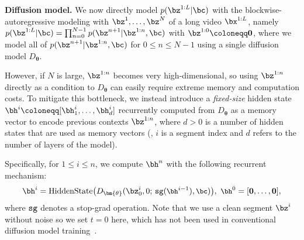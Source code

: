\textbf{Diffusion model.}
We now directly model $p(\bz^{1:L}|\bc)$ with the blockwise-autoregressive modeling with $\bz^{1}, \ldots, \bz^{N}$ of a long video $\bx^{1:L}$, namely $p (\bz^{1:L} | \bc) = \prod_{n=0}^{N-1} p(\bz^{n+1} | \bz^{1:n}, \bc)$ with $\bz^{1:0}\coloneqq \mathbf{0}$,
where we model all of $p(\bz^{n+1} | \bz^{1:n}, \bc)$ for $0\leq n \leq N-1$ using a single diffusion model $D_{\bm{\theta}}$.

However, if $N$ is large, $\bz^{1:n}$ becomes very high-dimensional, so using $\bz^{1:n}$ directly as a condition to $D_{\bm{\theta}}$ can easily require extreme memory and computation costs. To mitigate this bottleneck, we instead introduce a \emph {fixed-size} hidden state $\bh^{i} \coloneqq [\bh^{i}_1, \ldots, \bh^{i}_{d}]$ recurrently computed from $D_{\bm{\theta}}$ as a memory vector to encode previous contexts $\bz^{1:n}$, where $d>0$ is a number of hidden states that are used as memory vectors (\ie, $i$ is a segment index and $d$ refers to the number of layers of the model). 

Specifically, for $1 \leq i \leq n$, we compute $\bh^n$ with the following recurrent mechanism:
\begin{align}
    \bh^{i} = \mathrm{HiddenState}\big(D_{\bm{\theta}} (\bz_0^{i}, 0;\, \small{\mathtt{sg}}(\bh^{i-1}), \bc)\big), \,\, \bh^{0} = [\mathbf{0}, \ldots, \mathbf{0}],
\end{align}
where $\small{\mathtt{sg}}$ denotes a stop-grad operation. Note that we use a clean segment $\bz^{i}$ without noise so we set $t=0$ here, which has not been used in conventional diffusion model training~\citep{ho2021denoising,song2021denoising,song2021scorebased}.


